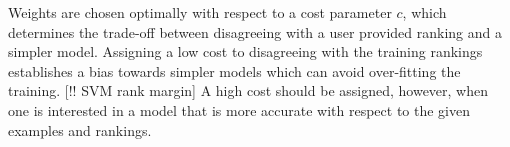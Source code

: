 Weights are chosen optimally with respect to a cost parameter $c$, which determines the trade-off between disagreeing with a user provided ranking and a simpler model.
Assigning a low cost to disagreeing with the training rankings establishes a bias towards simpler models which can avoid over-fitting the training.
[!! SVM rank margin] A high cost should be assigned, however, when one is interested in a model that is more accurate with respect to the given examples and rankings.